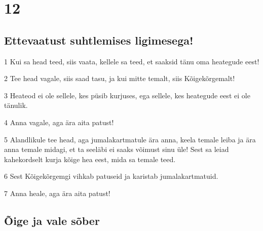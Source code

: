\chapter{12}

\section*{Ettevaatust suhtlemises ligimesega!}

\par 1 Kui sa head teed, siis vaata, kellele sa teed, et saaksid tänu oma heategude eest!
\par 2 Tee head vagale, siis saad tasu, ja kui mitte temalt, siis Kõigekõrgemalt!
\par 3 Heateod ei ole sellele, kes püsib kurjuses, ega sellele, kes heategude eest ei ole tänulik.
\par 4 Anna vagale, aga ära aita patust!
\par 5 Alandlikule tee head, aga jumalakartmatule ära anna, keela temale leiba ja ära anna temale midagi, et ta seeläbi ei saaks võimust sinu üle! Sest sa leiad kahekordselt kurja kõige hea eest, mida sa temale teed.
\par 6 Sest Kõigekõrgemgi vihkab patuseid ja karistab jumalakartmatuid.
\par 7 Anna heale, aga ära aita patust!

\section*{Õige ja vale sõber}

